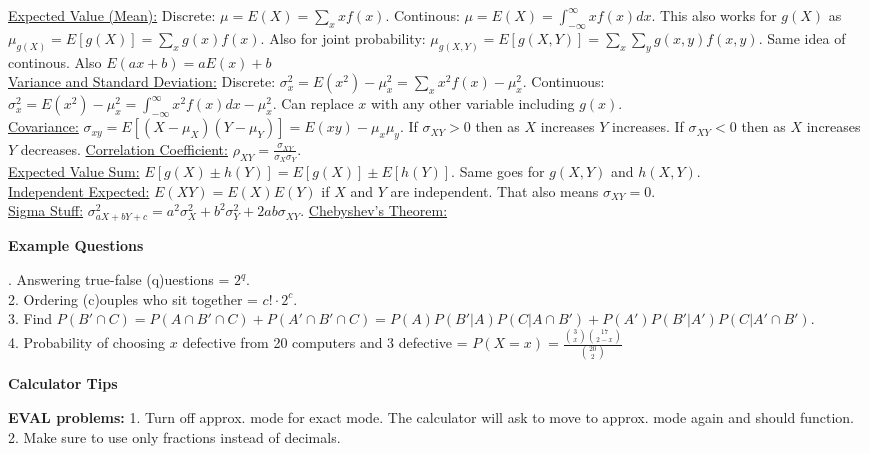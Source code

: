 \documentclass[9pt]{article}
\begin{document}
        \begin{multicols}{2}
            \underline{Expected Value (Mean):} Discrete: $\mu=E(X) = \sum_xxf(x)$. Continous: $\mu=E(X)=\int_{-\infty}^{\infty}xf(x)dx$. This also works for $g(X)$ as $\mu_{g(X)} = E[g(X)] = \sum_xg(x)f(x)$. Also for joint probability: $\mu_{g(X,Y)}=E[g(X,Y)]=\sum_x\sum_yg(x,y)f(x,y)$. Same idea of continous. Also $E(ax+b) = aE(x)+b$\\
            \underline{Variance and Standard Deviation:} Discrete: $\sigma_x^2=E(x^2)-\mu_x^2=\sum_xx^2f(x)-\mu_x^2$. Continuous: $\sigma_x^2=E(x^2)-\mu_x^2=\int_{-\infty}^{\infty}x^2f(x)dx-\mu_x^2$. Can replace $x$ with any other variable including $g(x)$.\\
            \underline{Covariance:} $\sigma_{xy} = E[(X-\mu_X)(Y-\mu_Y)]=E(xy)-\mu_x\mu_y$. If $\sigma_{XY}>0$ then as $X$ increases $Y$ increases. If $\sigma_{XY}<0$ then as $X$ increases $Y$ decreases.
            \underline{Correlation Coefficient:} $\rho_{XY}=\frac{\sigma_{XY}}{\sigma_X\sigma_Y}$.\\
            \underline{Expected Value Sum:} $E[g(X)\pm h(Y)] = E[g(X)]\pm E[h(Y)]$. Same goes for $g(X,Y)$ and $h(X,Y)$.\\
            \underline{Independent Expected:} $E(XY) = E(X)E(Y)$ if $X$ and $Y$ are independent. That also means $\sigma_{XY}=0$.\\
            \underline{Sigma Stuff:} $\sigma_{aX+bY+c}^{2}=a^2\sigma_X^2+b^2\sigma_Y^2+2ab\sigma_{XY}$.
            \underline{Chebyshev's Theorem:}
        \end{multicols}
    \noindent\textbf{Example Questions} 
        \begin{multicols}{2}
            . Answering true-false (q)uestions = $2^{q}$.\\
            2. Ordering (c)ouples who sit together = $c!\cdot 2^c$.\\
            3. Find $P(B'\cap C) = P(A\cap B'\cap C)+P(A'\cap B'\cap C) = P(A)P(B'|A)P(C|A\cap B') + P(A')P(B'|A')P(C|A'\cap B')$.\\
            4. Probability of choosing $x$ defective from 20 computers and 3 defective = $P(X = x) = \frac{\binom{3}{x}\binom{17}{2-x}}{\binom{20}{2}}$
        \end{multicols}
    \noindent\textbf{Calculator Tips}
        \begin{multicols}{2}
            \noindent\textbf{EVAL problems:} 1. Turn off approx. mode for exact mode. The calculator will ask to move to approx. mode again and should function. 2. Make sure to use only fractions instead of decimals.
        \end{multicols}
\end{document}
